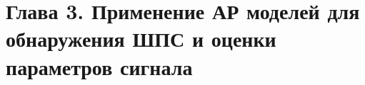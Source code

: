 


\section{Глава 3. Применение АР моделей для обнаружения ШПС и оценки параметров сигнала }

%




